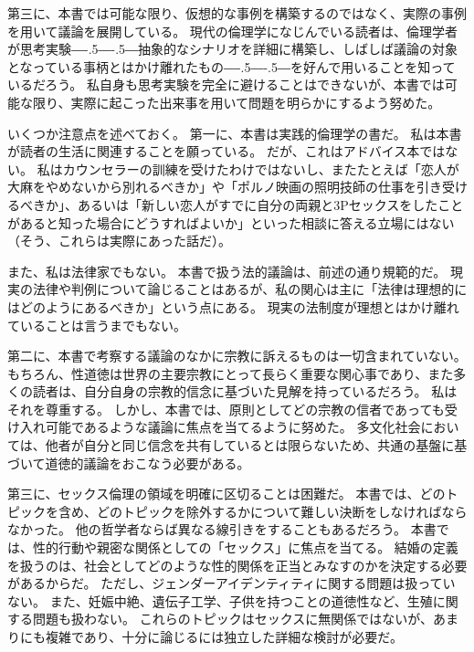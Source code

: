 \documentclass[paper=a4,book,openany]{jlreq}
\def\DDASH{―\kern-.5\zw―\kern-.5\zw―} %
\begin{document}
第三に、本書では可能な限り、仮想的な事例を構築するのではなく、実際の事例を用いて議論を展開している。
現代の倫理学になじんでいる読者は、倫理学者が思考実験{\DDASH}抽象的なシナリオを詳細に構築し、しばしば議論の対象となっている事柄とはかけ離れたもの{\DDASH}を好んで用いることを知っているだろう。
私自身も思考実験を完全に避けることはできないが、本書では可能な限り、実際に起こった出来事を用いて問題を明らかにするよう努めた。

いくつか注意点を述べておく。
第一に、本書は実践的倫理学の書だ。
私は本書が読者の生活に関連することを願っている。
だが、これはアドバイス本ではない。
私はカウンセラーの訓練を受けたわけではないし、またたとえば「恋人が大麻をやめないから別れるべきか」や「ポルノ映画の照明技師の仕事を引き受けるべきか」、あるいは「新しい恋人がすでに自分の両親と3Pセックスをしたことがあると知った場合にどうすればよいか」といった相談に答える立場にはない（そう、これらは実際にあった話だ\citep{savage21:_mum_dat}）。

また、私は法律家でもない。
本書で扱う法的議論は、前述の通り規範的だ。
現実の法律や判例について論じることはあるが、私の関心は主に「法律は理想的にはどのようにあるべきか」という点にある。
現実の法制度が理想とはかけ離れていることは言うまでもない。

第二に、本書で考察する議論のなかに宗教に訴えるものは一切含まれていない。
もちろん、性道徳は世界の主要宗教にとって長らく重要な関心事であり、また多くの読者は、自分自身の宗教的信念に基づいた見解を持っているだろう。
私はそれを尊重する。
しかし、本書では、原則としてどの宗教の信者であっても受け入れ可能であるような議論に焦点を当てるように努めた。
多文化社会においては、他者が自分と同じ信念を共有しているとは限らないため、共通の基盤に基づいて道徳的議論をおこなう必要がある。

第三に、セックス倫理の領域を明確に区切ることは困難だ。
本書では、どのトピックを含め、どのトピックを除外するかについて難しい決断をしなければならなかった。
他の哲学者ならば異なる線引きをすることもあるだろう。
本書では、性的行動や親密な関係としての「セックス」に焦点を当てる。
結婚の定義を扱うのは、社会としてどのような性的関係を正当とみなすのかを決定する必要があるからだ。
ただし、ジェンダーアイデンティティに関する問題は扱っていない。
また、妊娠中絶、遺伝子工学、子供を持つことの道徳性など、生殖に関する問題も扱わない。
これらのトピックはセックスに無関係ではないが、あまりにも複雑であり、十分に論じるには独立した詳細な検討が必要だ。
\end{document}
